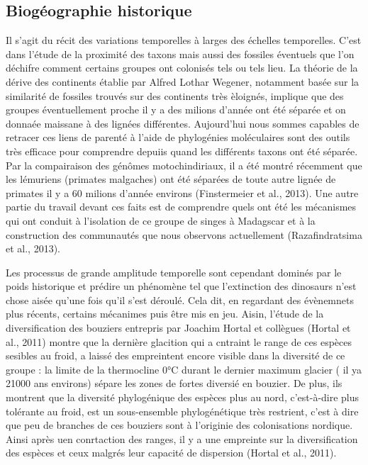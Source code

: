 \subsection*{Biogéographie
historique}\label{bioguxe9ographie-historique}

Il s'agit du récit des variations temporelles à larges des échelles
temporelles. C'est dans l'étude de la proximité des taxons mais aussi
des fossiles éventuels que l'on déchifre comment certains groupes ont
colonisés tels ou tels lieu. La théorie de la dérive des continents
établie par Alfred Lothar Wegener, notamment basée sur la similarité de
fossiles trouvés sur des continents très èloignés, implique que des
groupes éventuellement proche il y a des milions d'année ont été séparée
et on donnaée maissane à des lignées différentes. Aujourd'hui nous
sommes capables de retracer ces liens de parenté à l'aide de phylogénies
moléculaires sont des outils très efficace pour comprendre depuiis quand
les différents taxons ont été séparée. Par la compairaison des génômes
motochindiriaux, il a été montré récemment que les lémuriens (primates
malgaches) ont été séparées de toute autre lignée de primates il y a 60
milions d'année environs (Finstermeier et al., 2013). Une autre partie
du travail devant ces faits est de comprendre quels ont été les
mécanismes qui ont conduit à l'isolation de ce groupe de singes à
Madagscar et à la construction des communautés que nous observons
actuellement (Razafindratsima et al., 2013).

Les processus de grande amplitude temporelle sont cependant dominés par
le poids historique et prédire un phénomène tel que l'extinction des
dinosaurs n'est chose aisée qu'une fois qu'il s'est déroulé. Cela dit,
en regardant des évènemnets plus récents, certains mécanimes puis être
mis en jeu. Aisin, l'étude de la diversification des bouziers entrepris
par Joachim Hortal et collègues (Hortal et al., 2011) montre que la
dernière glacition qui a cntraint le range de ces espèces sesibles au
froid, a laissé des empreintent encore visible dans la diversité de ce
groupe : la limite de la thermocline 0°C durant le dernier maximum
glacier ( il ya 21000 ans environs) sépare les zones de fortes diversié
en bouzier. De plus, ils montrent que la diversité phylogénique des
espèces plus au nord, c'est-à-dire plus tolérante au froid, est un
sous-ensemble phylogénétique très restrient, c'est à dire que peu de
branches de ces bouziers sont à l'originie des colonisations nordique.
Ainsi après uen conrtaction des ranges, il y a une empreinte sur la
diversification des espèces et ceux malgrés leur capacité de dispersion
(Hortal et al., 2011).

